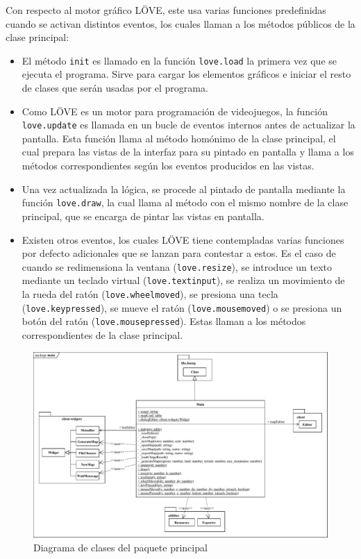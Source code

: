 Con respecto al motor gráfico LÖVE, este usa varias funciones predefinidas cuando se activan distintos eventos, los cuales llaman a los métodos públicos de la clase principal:

\begin{itemize}
	\item El método \texttt{init} es llamado en la función \texttt{love.load} la primera vez que se ejecuta el programa. Sirve para cargar los elementos gráficos e iniciar el resto de clases que serán usadas por el programa.
	\item Como LÖVE es un motor para programación de videojuegos, la función \texttt{love.update} es llamada en un bucle de eventos internos antes de actualizar la pantalla. Esta función llama al método homónimo de la clase principal, el cual prepara las vistas de la interfaz para su pintado en pantalla y llama a los métodos correspondientes según los eventos producidos en las vistas.
	\item Una vez actualizada la lógica, se procede al pintado de pantalla mediante la función \texttt{love.draw}, la cual llama al método con el mismo nombre de la clase principal, que se encarga de pintar las vistas en pantalla.
	\item Existen otros eventos, los cuales LÖVE tiene contempladas varias funciones por defecto adicionales que se lanzan para contestar a estos. Es el caso de cuando se redimensiona la ventana (\texttt{love.resize}), se introduce un texto mediante un teclado virtual (\texttt{love.textinput}), se realiza un movimiento de la rueda del ratón (\texttt{love.wheelmoved}), se presiona una tecla (\texttt{love.keypressed}), se mueve el ratón (\texttt{love.mousemoved}) o se presiona un botón del ratón (\texttt{love.mousepressed}). Estas llaman a los métodos correspondientes de la clase principal.
\end{itemize}

\begin{figure}
	\centering
	\includegraphics[width=\textwidth]{images/clase-principal.pdf}
	\caption{Diagrama de clases del paquete principal}
	\label{fig:mainclass}
\end{figure}

